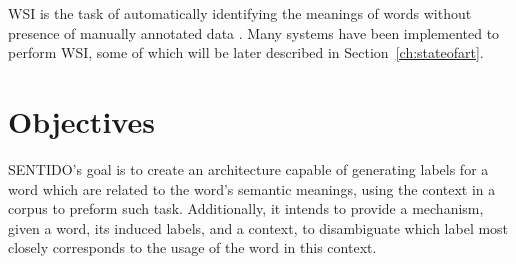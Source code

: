 \ac{WSI} is the task of automatically identifying the meanings of words
without presence of manually annotated data \cite{agirre2007semeval}. Many
systems have been implemented to perform \ac{WSI}, some of which
will be later described in Section~\ref{ch:stateofart}.

\section{Objectives}

\ac{SENTIDO}'s goal is to create an architecture capable of generating
labels for a word which are related to the word's semantic meanings, using the
context in a corpus to preform such task. Additionally, it intends to provide a
mechanism, given a word, its induced labels, and a context, to disambiguate
which label most closely corresponds to the usage of the word in this context.


